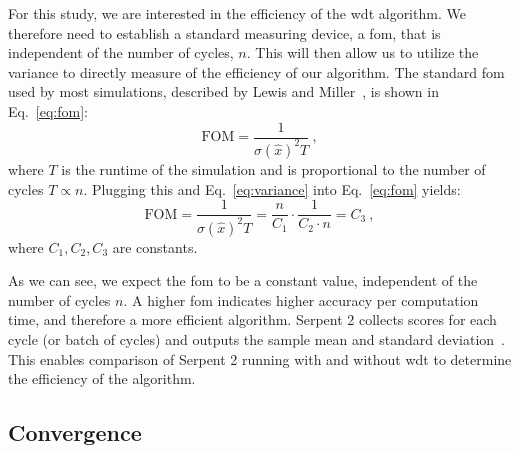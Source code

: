 For this study, we are interested in the efficiency of the \gls{wdt}
algorithm. We therefore need to establish a standard measuring device,
a \gls{fom}, that is independent of the number of cycles, $n$. This
will then allow us to utilize the variance to directly measure of the
efficiency of our algorithm. The standard \gls{fom} used by most
simulations, described by Lewis and Miller~\cite{lewis1993}, is shown
in Eq.~\eqref{eq:fom}:
\begin{equation}
  \label{eq:fom}
  \mathrm{FOM} = \frac{1}{\sigma(\hat{x})^2T}\:,
\end{equation}
where $T$ is the runtime of the simulation and is proportional to the number
of cycles $T \propto n$. Plugging this and
Eq.~\eqref{eq:variance} into Eq.~\eqref{eq:fom} yields:
\begin{equation*}
  \mathrm{FOM} = \frac{1}{\sigma(\hat{x})^2T} =
  \frac{n}{C_1}\cdot\frac{1}{C_2\cdot n} = C_3\:,
\end{equation*}
where $C_1,C_2,C_3$ are constants. 

As we can see, we expect the
\gls{fom} to be a constant value, independent of the number of cycles
$n$.  A higher \gls{fom} indicates higher accuracy per computation
time, and therefore a more efficient algorithm. Serpent 2 collects
scores for each cycle (or batch of cycles) and outputs the sample mean
and standard deviation~\cite{VTT-R-00371-14}. This enables comparison of Serpent 2
running with and without \gls{wdt} to determine the efficiency of the
algorithm.

\subsection{Convergence}
\label{sec:convergence}

